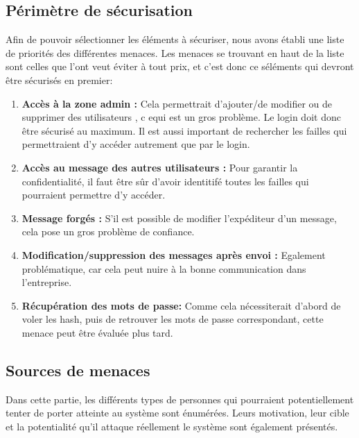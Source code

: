 \documentclass{article}
\begin{document}
\hypertarget{puxe9rimuxe8tre-de-suxe9curisation}{%
\subsection{Périmètre de
sécurisation}\label{puxe9rimuxe8tre-de-suxe9curisation}}

Afin de pouvoir sélectionner les éléments à sécuriser, nous avons établi
une liste de priorités des différentes menaces. Les menaces se trouvant
en haut de la liste sont celles que l'ont veut éviter à tout prix, et
c'est donc ce séléments qui devront être sécurisés en premier:

\begin{enumerate}
\def\labelenumi{\arabic{enumi}.}
\tightlist
\item
  \textbf{Accès à la zone admin :} Cela permettrait d'ajouter/de
  modifier ou de supprimer des utilisateurs , c equi est un gros
  problème. Le login doit donc être sécurisé au maximum. Il est aussi
  important de rechercher les failles qui permettraient d'y accéder
  autrement que par le login.
\item
  \textbf{Accès au message des autres utilisateurs :} Pour garantir la
  confidentialité, il faut être sûr d'avoir identitifé toutes les
  failles qui pourraient permettre d'y accéder.
\item
  \textbf{Message forgés :} S'il est possible de modifier l'expéditeur
  d'un message, cela pose un gros problème de confiance.
\item
  \textbf{Modification/suppression des messages après envoi :} Egalement
  problématique, car cela peut nuire à la bonne communication dans
  l'entreprise.
\item
  \textbf{Récupération des mots de passe:} Comme cela nécessiterait
  d'abord de voler les hash, puis de retrouver les mots de passe
  correspondant, cette menace peut être évaluée plus tard.
\end{enumerate}

\hypertarget{sources-de-menaces}{%
\subsection{Sources de menaces}\label{sources-de-menaces}}

Dans cette partie, les différents types de personnes qui pourraient
potentiellement tenter de porter atteinte au système sont énumérées.
Leurs motivation, leur cible et la potentialité qu'il attaque réellement
le système sont également présentés.
\end{document}
